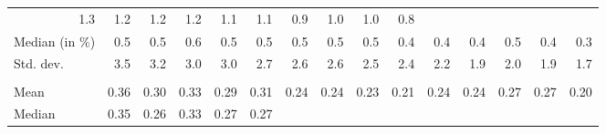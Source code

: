 \begin{tabular}{lllllllllllllll}
  \multicolumn{1}{r}{1.3} &
  \multicolumn{1}{r}{1.2} &
  \multicolumn{1}{r}{1.2} &
  \multicolumn{1}{r}{1.2} &
  \multicolumn{1}{r}{1.1} &
  \multicolumn{1}{r}{1.1} &
  \multicolumn{1}{r}{0.9} &
  \multicolumn{1}{r}{1.0} &
  \multicolumn{1}{r}{1.0} &
  \multicolumn{1}{r}{0.8} \\
\multicolumn{1}{l}{\hspace{2em}Median (in $\%$)} &
  \multicolumn{1}{|r}{0.5} &
  \multicolumn{1}{r}{0.5} &
  \multicolumn{1}{r}{0.6} &
  \multicolumn{1}{r}{0.5} &
  \multicolumn{1}{r}{0.5} &
  \multicolumn{1}{r}{0.5} &
  \multicolumn{1}{r}{0.5} &
  \multicolumn{1}{r}{0.5} &
  \multicolumn{1}{r}{0.4} &
  \multicolumn{1}{r}{0.4} &
  \multicolumn{1}{r}{0.4} &
  \multicolumn{1}{r}{0.5} &
  \multicolumn{1}{r}{0.4} &
  \multicolumn{1}{r}{0.3} \\
\multicolumn{1}{l}{\hspace{2em}Std. dev.} &
  \multicolumn{1}{|r}{3.5} &
  \multicolumn{1}{r}{3.2} &
  \multicolumn{1}{r}{3.0} &
  \multicolumn{1}{r}{3.0} &
  \multicolumn{1}{r}{2.7} &
  \multicolumn{1}{r}{2.6} &
  \multicolumn{1}{r}{2.6} &
  \multicolumn{1}{r}{2.5} &
  \multicolumn{1}{r}{2.4} &
  \multicolumn{1}{r}{2.2} &
  \multicolumn{1}{r}{1.9} &
  \multicolumn{1}{r}{2.0} &
  \multicolumn{1}{r}{1.9} &
  \multicolumn{1}{r}{1.7} \\
\multicolumn{1}{l}{\hspace{1em}{\textit{Elasticity} ($\widehat{\beta}$)}} &
  \multicolumn{1}{|r}{} &
  \multicolumn{1}{r}{} &
  \multicolumn{1}{r}{} &
  \multicolumn{1}{r}{} &
  \multicolumn{1}{r}{} &
  \multicolumn{1}{r}{} &
  \multicolumn{1}{r}{} &
  \multicolumn{1}{r}{} &
  \multicolumn{1}{r}{} &
  \multicolumn{1}{r}{} &
  \multicolumn{1}{r}{} &
  \multicolumn{1}{r}{} &
  \multicolumn{1}{r}{} &
  \multicolumn{1}{r}{} \\
\multicolumn{1}{l}{\hspace{2em}Mean } &
  \multicolumn{1}{|r}{0.36} &
  \multicolumn{1}{r}{0.30} &
  \multicolumn{1}{r}{0.33} &
  \multicolumn{1}{r}{0.29} &
  \multicolumn{1}{r}{0.31} &
  \multicolumn{1}{r}{0.24} &
  \multicolumn{1}{r}{0.24} &
  \multicolumn{1}{r}{0.23} &
  \multicolumn{1}{r}{0.21} &
  \multicolumn{1}{r}{0.24} &
  \multicolumn{1}{r}{0.24} &
  \multicolumn{1}{r}{0.27} &
  \multicolumn{1}{r}{0.27} &
  \multicolumn{1}{r}{0.20} \\
\multicolumn{1}{l}{\hspace{2em}Median } &
  \multicolumn{1}{|r}{0.35} &
  \multicolumn{1}{r}{0.26} &
  \multicolumn{1}{r}{0.33} &
  \multicolumn{1}{r}{0.27} &
  \multicolumn{1}{r}{0.27} &

\end{tabular}
